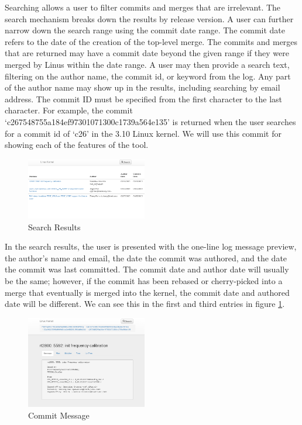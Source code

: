 \documentclass[conference, draftclsnofoot]{IEEEtran}
\begin{document}
Searching allows a user to filter commits and merges that are irrelevant. The search
mechanism breaks down the results by release version. A user can further narrow down
the search range using the commit date range. The commit date refers to the date of
the creation of the top-level merge. The commits and merges that are returned may
have a commit date beyond the given range if they were merged by Linus within the
date range. A user may then provide a search text, filtering on the author name,
the commit id, or keyword from the log. Any part of the author name may show up in
the results, including searching by email address. The commit ID must be specified
from the first character to the last character. For example, the commit
`c267548755a184ef97301071300c1739a564e135' is returned when the user searches for a
commit id of `c26' in the 3.10 Linux kernel. We will use this commit for showing
each of the features of the tool.

\begin{figure}
        \centering
        \includegraphics[width=0.47\textwidth]{figures/search_results.png}
        \caption{Search Results}
        \label{fig:results}
\end{figure}

In the search results, the user is presented with the one-line log message preview,
the author's name and email, the date the commit was authored, and the date the
commit was last committed. The commit date and author date will usually be the same;
however, if the commit has been rebased or cherry-picked into a merge that
eventually is merged into the kernel, the commit date and authored date will be
different. We can see this in the first and third entries in figure
\ref{fig:results}.

\begin{figure}
        \centering
        \includegraphics[width=0.47\textwidth]{figures/message_view.png}
        \caption{Commit Message}
        \label{fig:message}
\end{figure}
\end{document}
